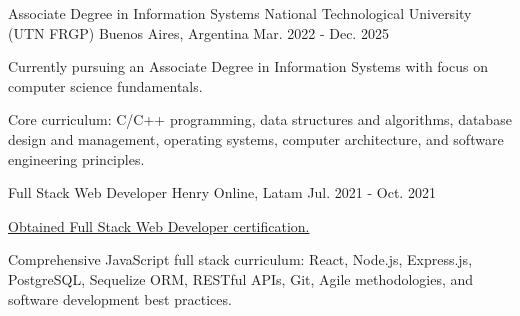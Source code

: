 

\begin{cventries}

  \cventry
    {Associate Degree in Information Systems} %
    {National Technological University (UTN FRGP)} %
    {Buenos Aires, Argentina} %
    {Mar. 2022 - Dec. 2025} %
    {
      \begin{cvitems} %
        \item {Currently pursuing an Associate Degree in Information Systems with focus on computer science fundamentals.}
        \item {Core curriculum: C/C++ programming, data structures and algorithms, database design and management, operating systems, computer architecture, and software engineering principles.}
      \end{cvitems}
    }
  \vspace{5.5mm}

  \cventry
    {Full Stack Web Developer} %
    {Henry} %
    {Online, Latam} %
    {Jul. 2021 - Oct. 2021} %
    {
      \begin{cvitems} %
        \item {\href{https://certificates.soyhenry.com/cert?id=970c6032-7d99-4536-90b3-e421ec1036d5}{Obtained Full Stack Web Developer certification.}}
        \item {Comprehensive JavaScript full stack curriculum: React, Node.js, Express.js, PostgreSQL, Sequelize ORM, RESTful APIs, Git, Agile methodologies, and software development best practices.}
      \end{cvitems}
    }

\end{cventries}
